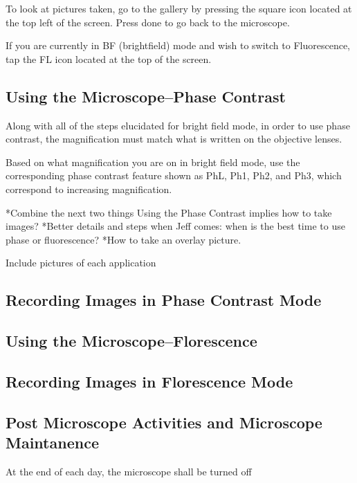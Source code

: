 \documentclass[12pt]{../SOP3_beta}
\begin{document}
\NP To look at pictures taken, go to the gallery by pressing the square icon located at the top left of the screen. Press done to go back to the microscope. 

\NP If you are currently in BF (brightfield) mode and wish to switch to Fluorescence, tap the FL icon located at the top of the screen.  

\subsection*{Using the Microscope--Phase Contrast}

\NP Along with all of the steps elucidated for bright field mode, in order to use phase contrast, the magnification must match what is written on the objective lenses.

\NP Based on what magnification you are on in bright field mode, use the corresponding phase contrast feature shown as PhL, Ph1, Ph2, and Ph3, which correspond to increasing magnification. 

*Combine the next two things Using the Phase Contrast implies how to take images?
*Better details and steps when Jeff comes: when is the best time to use phase or fluorescence? 
*How to take an overlay picture.

Include pictures of each application 

\subsection*{Recording Images in Phase Contrast Mode}



\subsection*{Using the Microscope--Florescence}



\subsection*{Recording Images in Florescence Mode}

\subsection*{Post Microscope Activities and Microscope Maintanence}

\NP At the end of each day, the microscope shall be turned off 
\end{document}
